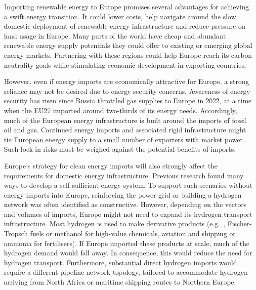 
Importing renewable energy to Europe promises several advantages for achieving a
swift energy transition. It could lower costs, help navigate around the slow
domestic deployment of renewable energy infrastructure and reduce pressure on
land usage in Europe. Many parts of the world have cheap and abundant renewable
energy supply potentials they could offer to existing or emerging global energy
markets.\cite{irenaGlobalHydrogen2022,luxSupplyCurves2021,vanderzwaanTimmermansDream2021,fasihiLongTermHydrocarbon2017,reichenbergDeepDecarbonization2022,galvanExportingSunshine2022,armijoFlexibleProduction2020,pfennigGlobalGISbasedPotential2023}
Partnering with these regions could help Europe reach its carbon neutrality
goals while stimulating economic development in exporting countries.


However, even if energy imports are economically attractive for Europe, a strong
reliance may not be desired due to energy security concerns. Awareness of energy
security has risen since Russia throttled gas supplies to Europe in
2022,\cite{pedersenLongtermImplications2022} at a time when the EU27 imported
around two-thirds of its energy needs.\cite{eurostatCompleteEnergy2023}
Accordingly, much of the European energy infrastructure is built around the
imports of fossil oil and gas. Continued energy imports and associated rigid
infrastructure might tie European energy supply to a small number of exporters
with market power. Such lock-in risks must be weighed against the potential
benefits of imports.


Europe's strategy for clean energy imports will also strongly affect the
requirements for domestic energy infrastructure. Previous research found many
ways to develop a self-sufficient energy
system.\cite{pickeringDiversityOptions2022,trondleHomemadeImported2019,brownSynergiesSector2018}
To support such scenarios without energy imports into Europe, reinforcing the
power grid or building a hydrogen network was often identified as
constructive.\cite{neumannPotentialRole2023,victoriaSpeedTechnological2022}
However, depending on the vectors and volumes of imports, Europe might not need
to expand its hydrogen transport infrastructure. Most hydrogen is used to make
derivative products (e.g.~, Fischer-Tropsch fuels or methanol for high-value
chemicals, aviation and shipping or ammonia for
fertilisers).\cite{neumannPotentialRole2023} If Europe imported these products
at scale, much of the hydrogen demand would fall away. In consequence, this
would reduce the need for hydrogen transport. Furthermore, substantial direct
hydrogen imports would require a different pipeline network topology, tailored
to accommodate hydrogen arriving from North Africa or maritime shipping routes
to Northern Europe.

